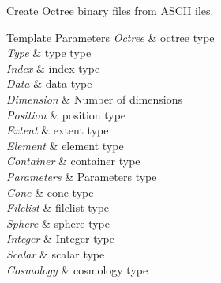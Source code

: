 Create Octree binary files from A\-S\-C\-I\-I iles. 
\begin{DoxyTemplParams}{Template Parameters}
{\em Octree} & octree type \\
\hline
{\em Type} & type type \\
\hline
{\em Index} & index type \\
\hline
{\em Data} & data type \\
\hline
{\em Dimension} & Number of dimensions \\
\hline
{\em Position} & position type \\
\hline
{\em Extent} & extent type \\
\hline
{\em Element} & element type \\
\hline
{\em Container} & container type \\
\hline
{\em Parameters} & Parameters type \\
\hline
{\em \hyperlink{exceptionCone}{Cone}} & cone type \\
\hline
{\em Filelist} & filelist type \\
\hline
{\em Sphere} & sphere type \\
\hline
{\em Integer} & Integer type \\
\hline
{\em Scalar} & scalar type \\
\hline
{\em Cosmology} & cosmology type \\
\hline
\end{DoxyTemplParams}


